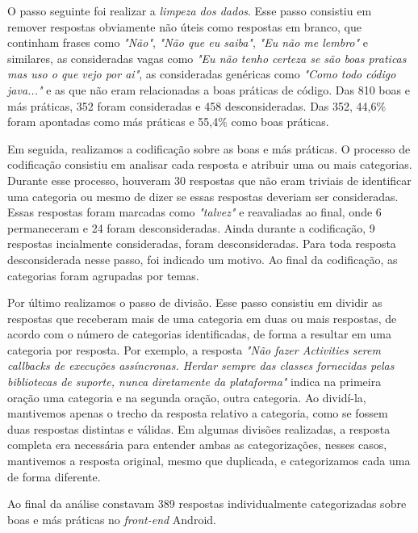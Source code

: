O passo seguinte foi realizar a \textit{limpeza dos dados}. Esse passo consistiu em remover respostas obviamente n\~ao \'uteis como respostas em branco, que continham frases como \textit{"N\~ao"}, \textit{"N\~ao que eu saiba"}, \textit{"Eu n\~ao me lembro"} e similares, as consideradas vagas como \textit{"Eu n\~ao tenho certeza se s\~ao boas praticas mas uso o que vejo por ai"}, as consideradas gen\'ericas como \textit{"Como todo c\'odigo java..."} e as que n\~ao eram relacionadas a boas pr\'aticas de c\'odigo. Das 810 boas e m\'as pr\'aticas, 352 foram consideradas e 458 desconsideradas. Das 352, 44,6\% foram apontadas como m\'as pr\'aticas e 55,4\% como boas pr\'aticas. 

Em seguida, realizamos a codifica\c{c}\~ao sobre as boas e m\'as pr\'aticas. O processo de codifica\c{c}\~ao consistiu em analisar cada resposta e atribuir uma ou mais categorias. Durante esse processo, houveram 30 respostas que n\~ao eram triviais de identificar uma categoria ou mesmo de dizer se essas respostas deveriam ser consideradas. Essas respostas foram marcadas como \textit{"talvez"} e reavaliadas ao final, onde 6 permaneceram e 24 foram desconsideradas. Ainda durante a codifica\c{c}\~ao, 9 respostas incialmente consideradas, foram desconsideradas. Para toda resposta desconsiderada nesse passo, foi indicado um motivo. Ao final da codifica\c{c}\~ao, as categorias foram agrupadas por temas.

Por \'ultimo realizamos o passo de divis\~ao. Esse passo consistiu em dividir as respostas que receberam mais de uma categoria em duas ou mais respostas, de acordo com o n\'umero de categorias identificadas, de forma a resultar em uma categoria por resposta. Por exemplo, a resposta \textit{"N\~ao fazer Activities serem callbacks de execu\c{c}\~oes ass\'incronas. Herdar sempre das classes fornecidas pelas bibliotecas de suporte, nunca diretamente da plataforma"} indica na primeira ora\c{c}\~ao uma categoria e na segunda ora\c{c}\~ao, outra categoria. Ao divid\'i-la, mantivemos apenas o trecho da resposta relativo a categoria, como se fossem duas respostas distintas e v\'alidas. Em algumas divis\~oes realizadas, a resposta completa era necess\'aria para entender ambas as categoriza\c{c}\~oes, nesses casos, mantivemos a resposta original, mesmo que duplicada, e categorizamos cada uma de forma diferente. 

Ao final da an\'alise constavam 389 respostas individualmente categorizadas sobre boas e m\'as pr\'aticas no \textit{front-end} Android.